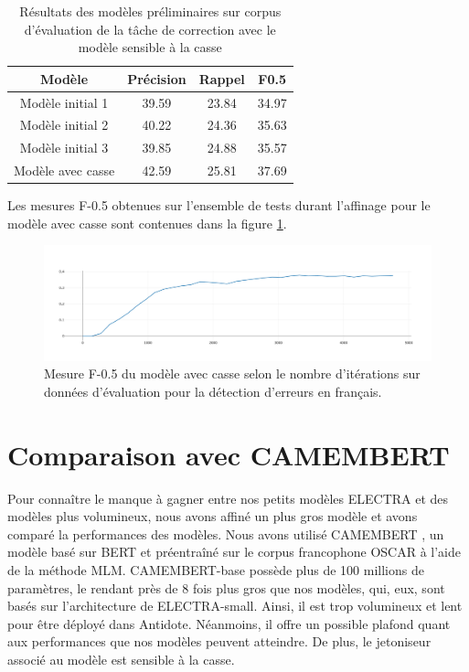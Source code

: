 \documentclass[12pt,twoside,rapport]{dms}
\theoremstyle{definition}
\numberwithin{equation}{section}
\numberwithin{table}{chapter}
\numberwithin{figure}{chapter}
\begin{document}
\begin{table}
	\centering
	\begin{tabular}{||c | c | c | c||}
		\hline
		Modèle            & Précision & Rappel & F0.5  \\ [0.5ex]
		\hline\hline
		Modèle initial 1  & 39.59     & 23.84  & 34.97 \\
		Modèle initial 2  & 40.22     & 24.36  & 35.63 \\
		Modèle initial 3  & 39.85     & 24.88  & 35.57 \\
		Modèle avec casse & 42.59     & 25.81  & 37.69 \\
		\hline
	\end{tabular}
	\caption{Résultats des modèles préliminaires sur corpus d'évaluation de la tâche de correction avec le modèle sensible à la casse}
	\label{table:resaffinagecasse}
\end{table}

Les mesures F-0.5 obtenues sur l'ensemble de tests durant l'affinage pour le
modèle avec casse sont contenues dans la figure \ref{fig:f05electraaveccasse}.
\begin{figure}
	\begin{center}
		\includegraphics[width=1.0\textwidth]{figures/electraaveccassef05.png}
	\end{center}
	\caption{Mesure F-0.5 du modèle avec casse selon le nombre d'itérations sur
		données d'évaluation pour la détection d'erreurs en
		français.}\label{fig:f05electraaveccasse}
\end{figure}

\section{Comparaison avec CAMEMBERT}
Pour connaître le manque à gagner entre nos petits modèles ELECTRA et des
modèles plus volumineux, nous avons affiné un plus gros modèle et avons comparé
la performances des modèles. Nous avons utilisé CAMEMBERT \cite{camembert}, un
modèle basé sur BERT et préentraîné sur le corpus francophone OSCAR
\cite{oscar} à l'aide de la méthode MLM. CAMEMBERT-base possède plus de 100
millions de paramètres, le rendant près de 8 fois plus gros que nos modèles,
qui, eux, sont basés sur l'architecture de ELECTRA-small. Ainsi, il est trop
volumineux et lent pour être déployé dans Antidote. Néanmoins, il offre un
possible plafond quant aux performances que nos modèles peuvent atteindre. De
plus, le jetoniseur associé au modèle est sensible à la casse. \\
\end{document}
